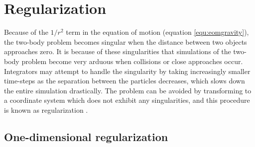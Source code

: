 \documentclass[english, oneside]{HYgradu}
\begin{document}
\section{Regularization}

Because of the $1/r^2$ term in the equation of motion (equation \ref{equ:eomgravity}), the two-body problem becomes singular when the distance between two objects approaches zero. It is because of these singularities that simulations of the two-body problem become very arduous when collisions or close approaches occur. Integrators may attempt to handle the singularity by taking increasingly smaller time-steps as the separation between the particles decreases, which slows down the entire simulation drastically. The problem can be avoided by transforming to a coordinate system which does not exhibit any singularities, and this procedure is known as regularization \citep{bt-galdyn}. 

\subsection{One-dimensional regularization}
\end{document}
